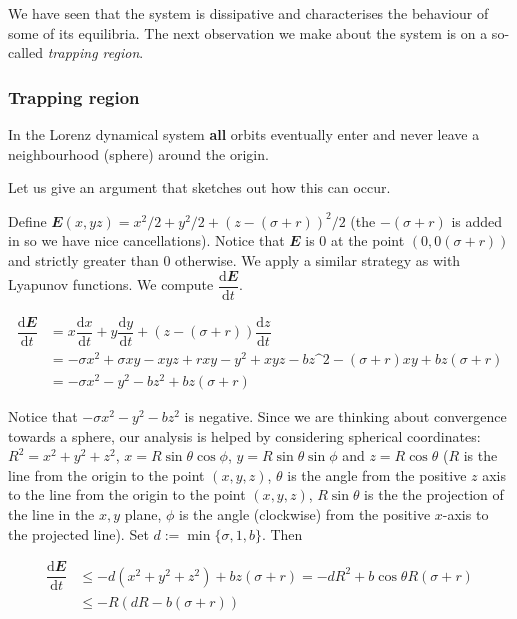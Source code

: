 \documentclass[
  a4paper,
  oneside,
  final]{krantz}
\renewcommand{\d}{\mathrm{d}}
\renewcommand{\v}[1]{{\mathbfit{#1}}}
\newcommand{\der}[2]{\dfrac{\d #1}{\d #2}}
\theoremstyle{definition}
\theoremstyle{definition}
\theoremstyle{definition}
\theoremstyle{definition}
\theoremstyle{remark}
\begin{document}
We have seen that the system is dissipative and characterises the
behaviour of some of its equilibria. The next observation we make about
the system is on a so-called \emph{trapping region}.

\hypertarget{trapping-region}{%
\subsubsection*{Trapping region}\label{trapping-region}}


In the Lorenz dynamical system \textbf{all} orbits eventually enter and never
leave a neighbourhood (sphere) around the origin.

Let us give an argument that sketches out how this can occur.

Define \(\v{E}(x,yz) = x^2/2 + y^2/2 + ( z - (\sigma + r))^2/2\) (the
\(-(\sigma +r)\) is added in so we have nice cancellations). Notice that
\(\v{E}\) is \(0\) at the point \((0,0 (\sigma+r))\) and strictly greater than
\(0\) otherwise. We apply a similar strategy as with Lyapunov functions.
We compute \(\der{\v{E}}{t}\).

\begin{align*} 
\der{\v{E}}{t} &= x \der{x}{t} + y \der{y}{t} +
\left(z-(\sigma + r)\right) \der{z}{t}\\ &= - \sigma x^2 +
\sigma xy -xyz + rxy - y^2 + xyz - bz\^2 - (\sigma + r)xy +bz(\sigma
+r)\\ &= -\sigma x^2 - y^2 -bz^2 + bz(\sigma + r) 
\end{align*}

Notice that \(-\sigma x^2 - y^2 -bz^2\) is negative. Since we are thinking
about convergence towards a sphere, our analysis is helped by
considering spherical coordinates: \(R^2 = x^2 + y^2 + z^2\),
\(x = R \sin \theta \cos \phi\), \(y= R \sin \theta \sin \phi\) and
\(z = R \cos \theta\) (\(R\) is the line from the origin to the point
\((x,y,z)\), \(\theta\) is the angle from the positive \(z\) axis to the line
from the origin to the point \((x,y,z)\), \(R \sin \theta\) is the the
projection of the line in the \(x,y\) plane, \(\phi\) is the angle
(clockwise) from the positive \(x\)-axis to the projected line). Set
\(d := \min \{\sigma, 1, b\}\). Then

\begin{align*}
\der{\v{E}}{t} &\le -d(x^2 + y^2 + z^2) + bz (\sigma + r) =
-dR^2 +b \cos\theta R (\sigma +r)\\
& \le -R (dR - b(\sigma + r))
\end{align*}
\end{document}
